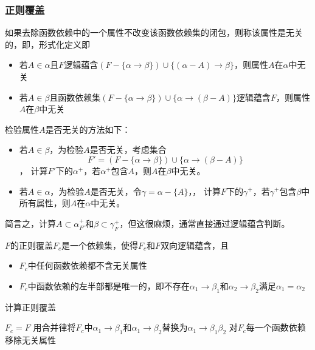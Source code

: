 \subsubsection{正则覆盖}
\begin{definition}[无关(extraneous)]
如果去除函数依赖中的一个属性不改变该函数依赖集的闭包，则称该属性是无关的，即，形式化定义即
\begin{itemize}
	\item 若$A\in\alpha$且$F$逻辑蕴含$(F-\{\alpha\to\beta\})\cup\{(\alpha-A)\to\beta\}$，则属性$A$在$\alpha$中无关
	\item 若$A\in\beta$且函数依赖集$(F-\{\alpha\to\beta\})\cup\{\alpha\to(\beta-A)\}$逻辑蕴含$F$，则属性$A$在$\beta$中无关
\end{itemize}
\end{definition}

检验属性$A$是否无关的方法如下：
\begin{itemize}
	\item 若$A\in\beta$，为检验$A$是否无关，考虑集合
	\[F'=(F-\{\alpha\to\beta\})\cup\{\alpha\to(\beta-A)\}\]
	，
	计算$F'$下的$\alpha^+$，若$\alpha^+$包含$A$，则$A$在$\beta$中无关。
	\item 若$A\in\alpha$，为检验$A$是否无关，令$\gamma=\alpha-\{A\}$，，
	计算$F$下的$\gamma^+$，若$\gamma^+$包含$\beta$中所有属性，则$A$在$\alpha$中无关。
\end{itemize}
简言之，计算$A\subset\alpha_{F'}^+$和$\beta\subset\gamma_{F}^+$，但这很麻烦，通常直接通过逻辑蕴含判断。

\begin{definition}
$F$的正则覆盖$F_c$是一个依赖集，使得$F_c$和$F$双向逻辑蕴含，且
\begin{itemize}
	\item $F_c$中任何函数依赖都不含无关属性
	\item $F_c$中函数依赖的左半部都是唯一的，即不存在$\alpha_1\to\beta_1$和$\alpha_2\to\beta_2$满足$\alpha_1=\alpha_2$
\end{itemize}
\end{definition}
\begin{algorithm}
\caption{计算正则覆盖}
\begin{algorithmic}[1]
\State $F_c=F$
\Repeat
\State 用合并律将$F_c$中$\alpha_1\to\beta_1$和$\alpha_1\to\beta_2$替换为$\alpha_1\to\beta_1\beta_2$
\State 对$F_c$每一个函数依赖移除无关属性
\end{algorithmic}
\end{algorithm}

